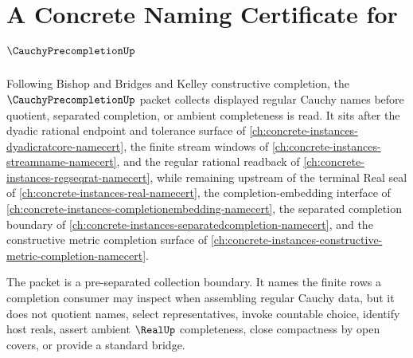 \chapter{A Concrete Naming Certificate for $\CauchyPrecompletionUp$}
\label{ch:concrete-instances-cauchy-precompletion-namecert}

Following Bishop and Bridges and Kelley constructive completion, the $\CauchyPrecompletionUp$ packet collects displayed regular Cauchy names before quotient, separated completion, or ambient completeness is read. It sits after the dyadic rational endpoint and tolerance surface of \autoref{ch:concrete-instances-dyadicratcore-namecert}, the finite stream windows of \autoref{ch:concrete-instances-streamname-namecert}, and the regular rational readback of \autoref{ch:concrete-instances-regseqrat-namecert}, while remaining upstream of the terminal Real seal of \autoref{ch:concrete-instances-real-namecert}, the completion-embedding interface of \autoref{ch:concrete-instances-completionembedding-namecert}, the separated completion boundary of \autoref{ch:concrete-instances-separatedcompletion-namecert}, and the constructive metric completion surface of \autoref{ch:concrete-instances-constructive-metric-completion-namecert}.

The packet is a pre-separated collection boundary. It names the finite rows a completion consumer may inspect when assembling regular Cauchy data, but it does not quotient names, select representatives, invoke countable choice, identify host reals, assert ambient $\RealUp$ completeness, close compactness by open covers, or provide a standard bridge.

